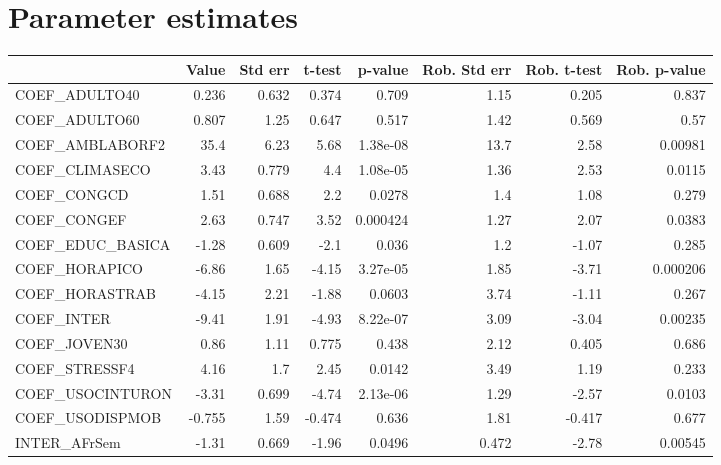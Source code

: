 \section{Parameter estimates}
\begin{tabular}{lrrrrrrr}
\toprule
{} &  Value &  Std err &  t-test &  p-value &  Rob. Std err &  Rob. t-test &  Rob. p-value \\
\midrule
COEF\_ADULTO40      &  0.236 &    0.632 &   0.374 &    0.709 &          1.15 &        0.205 &         0.837 \\
COEF\_ADULTO60      &  0.807 &     1.25 &   0.647 &    0.517 &          1.42 &        0.569 &          0.57 \\
COEF\_AMBLABORF2    &   35.4 &     6.23 &    5.68 & 1.38e-08 &          13.7 &         2.58 &       0.00981 \\
COEF\_CLIMASECO     &   3.43 &    0.779 &     4.4 & 1.08e-05 &          1.36 &         2.53 &        0.0115 \\
COEF\_CONGCD        &   1.51 &    0.688 &     2.2 &   0.0278 &           1.4 &         1.08 &         0.279 \\
COEF\_CONGEF        &   2.63 &    0.747 &    3.52 & 0.000424 &          1.27 &         2.07 &        0.0383 \\
COEF\_EDUC\_BASICA   &  -1.28 &    0.609 &    -2.1 &    0.036 &           1.2 &        -1.07 &         0.285 \\
COEF\_HORAPICO      &  -6.86 &     1.65 &   -4.15 & 3.27e-05 &          1.85 &        -3.71 &      0.000206 \\
COEF\_HORASTRAB     &  -4.15 &     2.21 &   -1.88 &   0.0603 &          3.74 &        -1.11 &         0.267 \\
COEF\_INTER         &  -9.41 &     1.91 &   -4.93 & 8.22e-07 &          3.09 &        -3.04 &       0.00235 \\
COEF\_JOVEN30       &   0.86 &     1.11 &   0.775 &    0.438 &          2.12 &        0.405 &         0.686 \\
COEF\_STRESSF4      &   4.16 &      1.7 &    2.45 &   0.0142 &          3.49 &         1.19 &         0.233 \\
COEF\_USOCINTURON   &  -3.31 &    0.699 &   -4.74 & 2.13e-06 &          1.29 &        -2.57 &        0.0103 \\
COEF\_USODISPMOB    & -0.755 &     1.59 &  -0.474 &    0.636 &          1.81 &       -0.417 &         0.677 \\
INTER\_AFrSem       &  -1.31 &    0.669 &   -1.96 &   0.0496 &         0.472 &        -2.78 &       0.00545 \\

\end{tabular}
